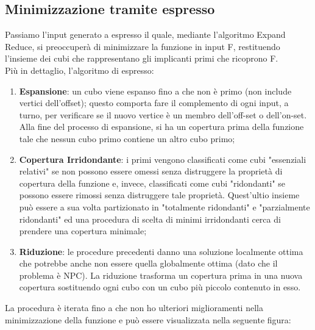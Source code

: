 \documentclass[a4paper,11pt]{article} %
\begin{document}
\subsection{Minimizzazione tramite espresso}
Passiamo l’input generato a espresso il quale, mediante l’algoritmo Expand Reduce, si preoccuperà di minimizzare la funzione in input F, restituendo l’insieme dei cubi che rappresentano gli implicanti primi che ricoprono F.\\
Più in dettaglio, l'algoritmo di espresso:
\begin{enumerate}
	\item \textbf{Espansione}: un cubo viene espanso fino a che non è primo (non include vertici dell'offset); questo comporta fare il complemento di ogni input, a turno, per verificare se il nuovo vertice è un membro dell'off-set o dell'on-set. Alla fine del processo di espansione, si ha un copertura prima della funzione tale che nessun cubo primo contiene un altro cubo primo;
	\item \textbf{Copertura Irridondante}: i primi vengono classificati come cubi "essenziali relativi" se non possono essere omessi senza distruggere la proprietà di copertura della funzione e, invece, classificati come cubi "ridondanti" se possono essere rimossi senza distruggere tale proprietà. Quest'ultio insieme può essere a sua volta partizionato in "totalmente ridondanti" e "parzialmente ridondanti" ed una procedura di scelta di minimi irridondanti cerca di prendere una copertura minimale;
	\item \textbf{Riduzione}: le procedure precedenti danno una soluzione localmente ottima che potrebbe anche non essere quella globalmente ottima (dato che il problema è NPC). La riduzione trasforma un copertura prima in una nuova copertura sostituendo ogni cubo con un cubo più piccolo contenuto in esso.
\end{enumerate}
La procedura è iterata fino a che non ho ulteriori miglioramenti nella minimizzazione della funzione e può essere visualizzata nella seguente figura:
\end{document}
